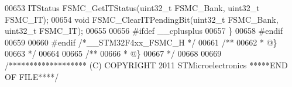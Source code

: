 \begin{DoxyCode}
00653 ITStatus FSMC_GetITStatus(uint32\_t FSMC\_Bank, uint32\_t FSMC\_IT);
00654 \textcolor{keywordtype}{void} FSMC_ClearITPendingBit(uint32\_t FSMC\_Bank, uint32\_t FSMC\_IT);
00655 
00656 \textcolor{preprocessor}{#}\textcolor{preprocessor}{ifdef} \_\_cplusplus
00657 \}
00658 \textcolor{preprocessor}{#}\textcolor{preprocessor}{endif}
00659 
00660 \textcolor{preprocessor}{#}\textcolor{preprocessor}{endif} \textcolor{comment}{/*\_\_STM32F4xx\_FSMC\_H */}
00661 \textcolor{comment}{/**}
00662 \textcolor{comment}{  * @\}}
00663 \textcolor{comment}{  */}
00664 
00665 \textcolor{comment}{/**}
00666 \textcolor{comment}{  * @\}}
00667 \textcolor{comment}{  */}
00668 
00669 \textcolor{comment}{/******************* (C) COPYRIGHT 2011 STMicroelectronics *****END OF FILE****/}
\end{DoxyCode}
